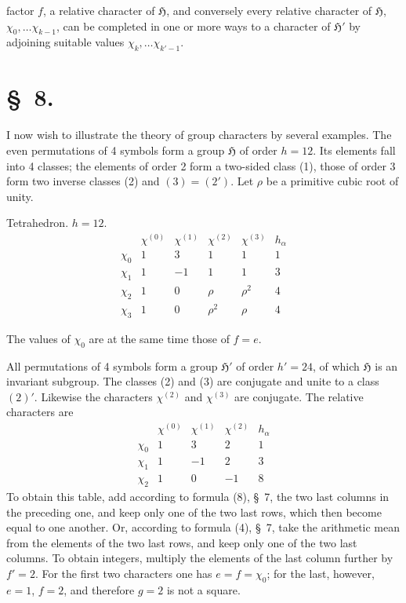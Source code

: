 \documentclass[11pt]{article}
\newcommand{\grp}{\mathfrak{H}}
\begin{document}
factor $f$, a relative character of $\grp$, and conversely every relative character of $\grp$, $\chi_0,\ldots \chi_{k-1}$, can be completed in one or more ways to a character of $\grp'$ by adjoining suitable values $\chi_k,\ldots \chi_{k'-1}$.

\section*{\S~8.}

I now wish to illustrate the theory of group characters by several examples. The even permutations of 4 symbols form a group $\grp$ of order $h=12$. Its elements fall into 4 classes; the elements of order 2 form a two-sided class (1), those of order 3 form two inverse classes (2) and $(3)=(2')$. Let $\rho$ be a primitive cubic root of unity.

\begin{center}
Tetrahedron. $h=12$.
\[
\begin{array}{c|rrrr|r}
 & \chi^{(0)} & \chi^{(1)} & \chi^{(2)} & \chi^{(3)} & h_\alpha\\ \hline
\chi_0 & 1 & 3 & 1 & 1 & 1\\
\chi_1 & 1 & -1 & 1 & 1 & 3\\
\chi_2 & 1 & 0 & \rho & \rho^2 & 4\\
\chi_3 & 1 & 0 & \rho^2 & \rho & 4
\end{array}
\]
\end{center}

The values of $\chi_0$ are at the same time those of $f=e$.

All permutations of 4 symbols form a group $\grp'$ of order $h'=24$, of which $\grp$ is an invariant subgroup. The classes (2) and (3) are conjugate and unite to a class $(2)'$. Likewise the characters $\chi^{(2)}$ and $\chi^{(3)}$ are conjugate. The relative characters are
\[
\begin{array}{c|rrr|r}
 & \chi^{(0)} & \chi^{(1)} & \chi^{(2)} & h_\alpha\\ \hline
\chi_0 & 1 & 3 & 2 & 1\\
\chi_1 & 1 & -1 & 2 & 3\\
\chi_2 & 1 & 0 & -1 & 8
\end{array}
\]
To obtain this table, add according to formula (8), \S~7, the two last columns in the preceding one, and keep only one of the two last rows, which then become equal to one another. Or, according to formula (4), \S~7, take the arithmetic mean from the elements of the two last rows, and keep only one of the two last columns. To obtain integers, multiply the elements of the last column further by $f'=2$. For the first two characters one has $e=f=\chi_0$; for the last, however, $e=1$, $f=2$, and therefore $g=2$ is not a square.
\end{document}
